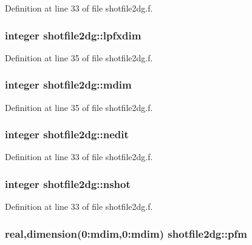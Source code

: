 Definition at line 33 of file shotfile2dg.f.\hypertarget{namespaceshotfile2dg_d8ec7f26f5f68dace4655cd811c755a1}{
\subsubsection[lpfxdim]{\setlength{\rightskip}{0pt plus 5cm}integer {\bf shotfile2dg::lpfxdim}}}
\label{namespaceshotfile2dg_d8ec7f26f5f68dace4655cd811c755a1}




Definition at line 35 of file shotfile2dg.f.\hypertarget{namespaceshotfile2dg_d5647f654b30284142951c13b5f6fa46}{
\subsubsection[mdim]{\setlength{\rightskip}{0pt plus 5cm}integer {\bf shotfile2dg::mdim}}}
\label{namespaceshotfile2dg_d5647f654b30284142951c13b5f6fa46}




Definition at line 35 of file shotfile2dg.f.\hypertarget{namespaceshotfile2dg_aba5c8cf053397dddeded69b88f887e2}{
\subsubsection[nedit]{\setlength{\rightskip}{0pt plus 5cm}integer {\bf shotfile2dg::nedit}}}
\label{namespaceshotfile2dg_aba5c8cf053397dddeded69b88f887e2}




Definition at line 33 of file shotfile2dg.f.\hypertarget{namespaceshotfile2dg_e24378204407e119ddc87122265ea324}{
\subsubsection[nshot]{\setlength{\rightskip}{0pt plus 5cm}integer {\bf shotfile2dg::nshot}}}
\label{namespaceshotfile2dg_e24378204407e119ddc87122265ea324}




Definition at line 33 of file shotfile2dg.f.\hypertarget{namespaceshotfile2dg_b2c08adaa9f0f8970d344c63abbf3790}{
\subsubsection[pfm]{\setlength{\rightskip}{0pt plus 5cm}real,dimension(0:{\bf mdim},0:{\bf mdim}) {\bf shotfile2dg::pfm}}}
\label{namespaceshotfile2dg_b2c08adaa9f0f8970d344c63abbf3790}




